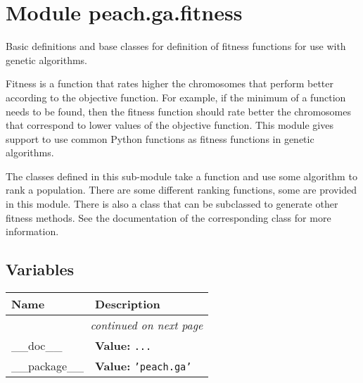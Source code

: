 %
%
%


\section{Module peach.ga.fitness}

    \label{peach:ga:fitness}

Basic definitions and base classes for definition of fitness functions for use
with genetic algorithms.

Fitness is a function that rates higher the chromosomes that perform better
according to the objective function. For example, if the minimum of a function
needs to be found, then the fitness function should rate better the chromosomes
that correspond to lower values of the objective function. This module gives
support to use common Python functions as fitness functions in genetic
algorithms.

The classes defined in this sub-module take a function and use some algorithm to
rank a population. There are some different ranking functions, some are provided
in this module. There is also a class that can be subclassed to generate other
fitness methods. See the documentation of the corresponding class for more
information.


  \subsection{Variables}

    \vspace{-1cm}
\hspace{\varindent}\begin{longtable}{|p{\varnamewidth}|p{\vardescrwidth}|l}
\cline{1-2}
\cline{1-2} \centering \textbf{Name} & \centering \textbf{Description}& \\
\cline{1-2}
\endhead\cline{1-2}\multicolumn{3}{r}{\small\textit{continued on next page}}\\\endfoot\cline{1-2}
\endlastfoot\raggedright \_\-\_\-d\-o\-c\-\_\-\_\- & \raggedright \textbf{Value:} 
{\tt \texttt{...}}&\\
\cline{1-2}
\raggedright \_\-\_\-p\-a\-c\-k\-a\-g\-e\-\_\-\_\- & \raggedright \textbf{Value:} 
{\tt \texttt{'}\texttt{peach.ga}\texttt{'}}&\\
\cline{1-2}
\end{longtable}


